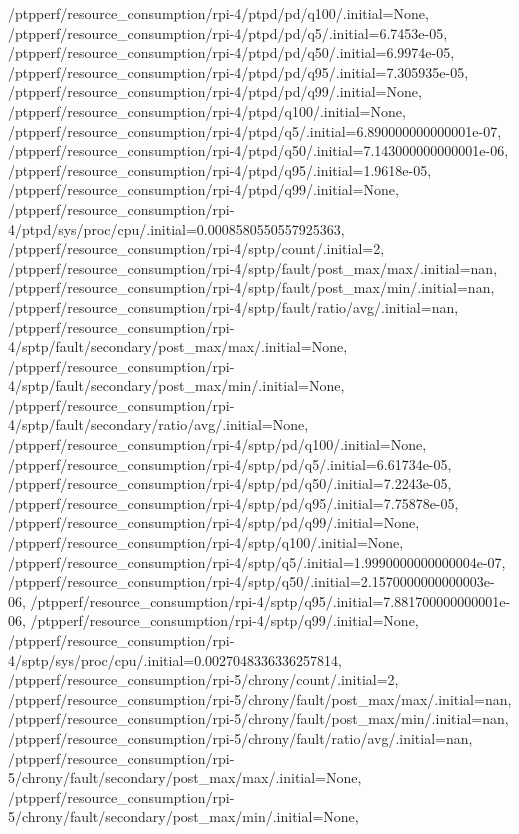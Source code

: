 {    /ptpperf/resource_consumption/rpi-4/ptpd/pd/q100/.initial=None,
    /ptpperf/resource_consumption/rpi-4/ptpd/pd/q5/.initial=6.7453e-05,
    /ptpperf/resource_consumption/rpi-4/ptpd/pd/q50/.initial=6.9974e-05,
    /ptpperf/resource_consumption/rpi-4/ptpd/pd/q95/.initial=7.305935e-05,
    /ptpperf/resource_consumption/rpi-4/ptpd/pd/q99/.initial=None,
    /ptpperf/resource_consumption/rpi-4/ptpd/q100/.initial=None,
    /ptpperf/resource_consumption/rpi-4/ptpd/q5/.initial=6.890000000000001e-07,
    /ptpperf/resource_consumption/rpi-4/ptpd/q50/.initial=7.143000000000001e-06,
    /ptpperf/resource_consumption/rpi-4/ptpd/q95/.initial=1.9618e-05,
    /ptpperf/resource_consumption/rpi-4/ptpd/q99/.initial=None,
    /ptpperf/resource_consumption/rpi-4/ptpd/sys/proc/cpu/.initial=0.0008580550557925363,
    /ptpperf/resource_consumption/rpi-4/sptp/count/.initial=2,
    /ptpperf/resource_consumption/rpi-4/sptp/fault/post_max/max/.initial=nan,
    /ptpperf/resource_consumption/rpi-4/sptp/fault/post_max/min/.initial=nan,
    /ptpperf/resource_consumption/rpi-4/sptp/fault/ratio/avg/.initial=nan,
    /ptpperf/resource_consumption/rpi-4/sptp/fault/secondary/post_max/max/.initial=None,
    /ptpperf/resource_consumption/rpi-4/sptp/fault/secondary/post_max/min/.initial=None,
    /ptpperf/resource_consumption/rpi-4/sptp/fault/secondary/ratio/avg/.initial=None,
    /ptpperf/resource_consumption/rpi-4/sptp/pd/q100/.initial=None,
    /ptpperf/resource_consumption/rpi-4/sptp/pd/q5/.initial=6.61734e-05,
    /ptpperf/resource_consumption/rpi-4/sptp/pd/q50/.initial=7.2243e-05,
    /ptpperf/resource_consumption/rpi-4/sptp/pd/q95/.initial=7.75878e-05,
    /ptpperf/resource_consumption/rpi-4/sptp/pd/q99/.initial=None,
    /ptpperf/resource_consumption/rpi-4/sptp/q100/.initial=None,
    /ptpperf/resource_consumption/rpi-4/sptp/q5/.initial=1.9990000000000004e-07,
    /ptpperf/resource_consumption/rpi-4/sptp/q50/.initial=2.1570000000000003e-06,
    /ptpperf/resource_consumption/rpi-4/sptp/q95/.initial=7.881700000000001e-06,
    /ptpperf/resource_consumption/rpi-4/sptp/q99/.initial=None,
    /ptpperf/resource_consumption/rpi-4/sptp/sys/proc/cpu/.initial=0.0027048336336257814,
    /ptpperf/resource_consumption/rpi-5/chrony/count/.initial=2,
    /ptpperf/resource_consumption/rpi-5/chrony/fault/post_max/max/.initial=nan,
    /ptpperf/resource_consumption/rpi-5/chrony/fault/post_max/min/.initial=nan,
    /ptpperf/resource_consumption/rpi-5/chrony/fault/ratio/avg/.initial=nan,
    /ptpperf/resource_consumption/rpi-5/chrony/fault/secondary/post_max/max/.initial=None,
    /ptpperf/resource_consumption/rpi-5/chrony/fault/secondary/post_max/min/.initial=None,
}
